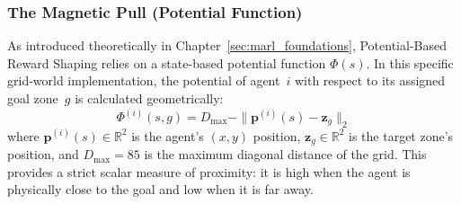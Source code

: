\subsubsection{The Magnetic Pull (Potential Function)}
As introduced theoretically in Chapter~\ref{sec:marl_foundations}, Potential-Based Reward Shaping relies on a state-based potential function $\Phi(s)$. In this specific grid-world implementation, the potential of agent~$i$ with respect to its assigned goal zone~$g$ is calculated geometrically:
\begin{equation}
\label{eq:potential}
    \Phi^{(i)}(s, g) = D_{\max} - \|\mathbf{p}^{(i)}(s) - \mathbf{z}_g\|_2
\end{equation}
where $\mathbf{p}^{(i)}(s)\in\mathbb{R}^2$ is the agent's $(x,y)$ position, $\mathbf{z}_g\in\mathbb{R}^2$ is the target zone's position, and $D_{\max}=85$ is the maximum diagonal distance of the grid. This provides a strict scalar measure of proximity: it is high when the agent is physically close to the goal and low when it is far away.

